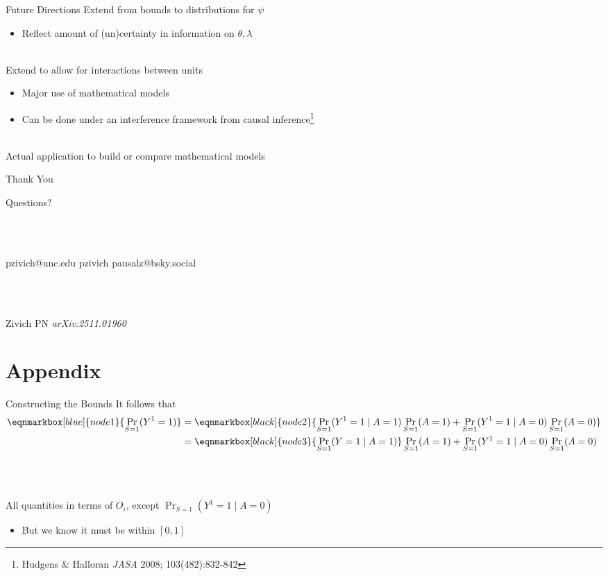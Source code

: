 \documentclass[aspectratio=169]{beamer}
\begin{document}
\begin{frame}{Future Directions}
	Extend from bounds to distributions for $\psi$
	\begin{itemize}
		\item Reflect amount of (un)certainty in information on $\theta,\lambda$
	\end{itemize}
	~\\
	Extend to allow for interactions between units
	\begin{itemize}
		\item Major use of mathematical models
		\item Can be done under an interference framework from causal inference\footnote[frame]{Hudgens \& Halloran \textit{JASA} 2008; 103(482):832-842}
	\end{itemize}
	~\\
	Actual application to build or compare mathematical models
\end{frame}

\begin{frame}{Thank You}
	\begin{center}
		\Large
		Questions?
	\end{center}
	~\\~\\
	\begin{center}
		\small
		\faEnvelope \quad pzivich@unc.edu \qquad \quad 
		\faGithub \quad pzivich \qquad \quad
		\faHashtag \quad pausalz@bsky.social
	\end{center}	
	~\\~\\
	\begin{center}
		Zivich PN \textit{arXiv:2511.01960}
	\end{center}
\end{frame}

\section{Appendix}

\begin{frame}{Constructing the Bounds}
	It follows that
	\begin{equation*}
		\begin{aligned}
			\eqnmarkbox[blue]{node1}{\Pr_{S=1}(Y^1 = 1)} & = 
			\eqnmarkbox[black]{node2}{\Pr_{S=1}(Y^1 = 1 \mid A=1) \Pr_{S=1}(A=1) + \Pr_{S=1}(Y^1 = 1 \mid A=0)\Pr_{S=1}(A=0)} \\
			& = \eqnmarkbox[black]{node3}{\Pr_{S=1}(Y = 1 \mid A=1)} \Pr_{S=1}(A=1) + \Pr_{S=1}(Y^1 = 1 \mid A=0)\Pr_{S=1}(A=0)
		\end{aligned}
	\end{equation*}
	~\\~\\~\\
	All quantities in terms of $O_i$, except $\Pr_{S=1}(Y^1 = 1 \mid A=0)$
	\begin{itemize}
		\item But we know it must be within $[0,1]$
	\end{itemize}
\end{frame}
\end{document}
